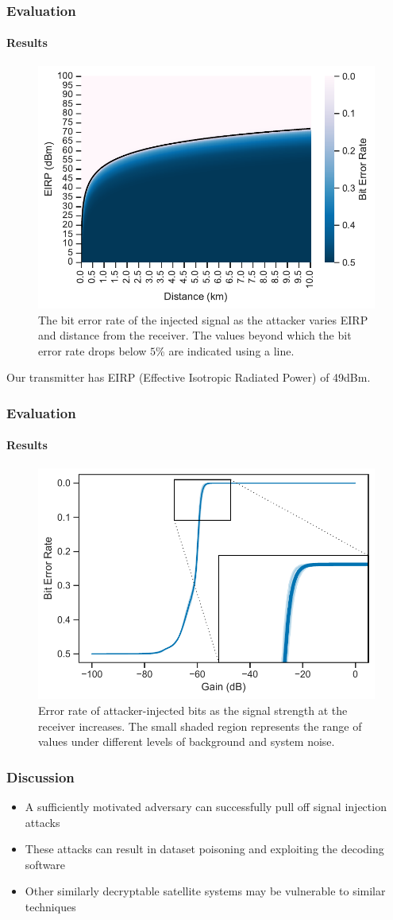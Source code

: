 \documentclass{beamer}
\begin{document}
\begin{frame}
  \frametitle{Evaluation}
  \framesubtitle{Results}
  \begin{figure}
      \centering
      \includegraphics[width=0.6\columnwidth]{images/distance_eirp_heatmap_95.pdf}
      \caption{The bit error rate of the injected signal as the attacker varies EIRP and distance from the receiver. The values beyond which the bit error rate drops below $5$\% are indicated using a line.}
      \label{fig:distance_eirp}
  \end{figure}
  Our transmitter has EIRP (Effective Isotropic Radiated Power) of 49dBm.
\end{frame}

\begin{frame}
  \frametitle{Evaluation}
  \framesubtitle{Results}
  \begin{figure}
      \centering
      \includegraphics[width=0.7\columnwidth]{images/overshadowing_ber_2.pdf}
      \caption{Error rate of attacker-injected bits as the signal strength at the receiver increases. The small shaded region represents the range of values under different levels of background and system noise.}
      \label{fig:overshadowing_ber}
  \end{figure}
\end{frame}

\begin{frame}
  \frametitle{Discussion}
  \begin{itemize}
    \item A sufficiently motivated adversary can successfully pull off signal injection attacks
    \item These attacks can result in dataset poisoning and exploiting the decoding software
    \item Other similarly decryptable satellite systems may be vulnerable to similar techniques
  \end{itemize}
\end{frame}
\end{document}
